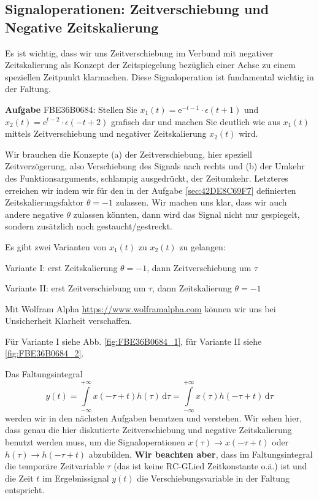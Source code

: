 \documentclass[11pt,a4paper,DIV=12]{scrartcl}
\numberwithin{equation}{section}
\numberwithin{figure}{section}
\newcommand\fsd{\mathrm{d}} %
\newcommand{\fig}[1]{Abb. \ref{#1}} %
\begin{document}
\subsection{Signaloperationen: Zeitverschiebung und Negative Zeitskalierung}
\label{sec:FBE36B0684}
\begin{Ziel}
Es ist wichtig, dass wir uns Zeitverschiebung im Verbund mit negativer Zeitskalierung
als Konzept der Zeitspiegelung bezüglich einer Achse zu einem speziellen Zeitpunkt
klarmachen. Diese Signaloperation ist fundamental wichtig in der Faltung.
\end{Ziel}
\textbf{Aufgabe} {\tiny FBE36B0684}: Stellen Sie
$x_1(t) = \mathrm{e}^{-t-1} \cdot \epsilon(t+1)$ und
$x_2(t) = \mathrm{e}^{t-2} \cdot \epsilon(-t+2)$
grafisch dar und machen Sie deutlich wie aus $x_1(t)$  mittels Zeitverschiebung
und negativer Zeitskalierung $x_2(t)$ wird.
\begin{Werkzeug}
Wir brauchen die Konzepte (a) der Zeitverschiebung, hier speziell Zeitverzögerung,
also Verschiebung des Signals nach rechts und (b) der Umkehr des Funktionsarguments,
schlampig ausgedrückt, der Zeitumkehr. Letzteres erreichen wir indem wir
für den in der Aufgabe \ref{sec:42DE8C69F7} definierten Zeitskalierungsfaktor
$\theta=-1$ zulassen. Wir machen uns klar, dass wir auch andere negative
$\theta$ zulassen könnten, dann wird das Signal nicht nur gespiegelt,
sondern zusätzlich noch gestaucht/gestreckt.
\end{Werkzeug}
\begin{Ansatz}
Es gibt zwei Varianten von $x_1(t)$ zu $x_2(t)$ zu gelangen:

Variante I: erst Zeitskalierung $\theta=-1$, dann Zeitverschiebung um $\tau$

Variante II: erst Zeitverschiebung um $\tau$, dann Zeitskalierung $\theta=-1$

\end{Ansatz}
\begin{ExCalc}
Mit Wolfram Alpha \url{https://www.wolframalpha.com} können wir uns bei
Unsicherheit Klarheit verschaffen.
\end{ExCalc}
\begin{Loesung}
Für Variante I siehe \fig{fig:FBE36B0684_1}, für Variante II siehe
\ref{fig:FBE36B0684_2}.

Das Faltungsintegral
\begin{equation}
y(t)
= \int\limits_{-\infty}^{+\infty} x(-\tau+t) h(\tau) \, \fsd \tau
= \int\limits_{-\infty}^{+\infty} x(\tau) h(-\tau+t) \, \fsd \tau
\end{equation}
werden wir in den nächsten Aufgaben benutzen und verstehen.
%
Wir sehen hier, dass genau die hier
diskutierte Zeitverschiebung und negative Zeitskalierung benutzt werden muss, um
die Signaloperationen $x(\tau) \rightarrow x(-\tau+t)$
oder $h(\tau) \rightarrow h(-\tau+t)$ abzubilden.
\textbf{Wir beachten aber}, dass im Faltungsintegral die temporäre Zeitvariable
$\tau$ (das ist keine RC-GLied Zeitkonstante o.ä.) ist und die Zeit $t$
im Ergebnissignal $y(t)$ die Verschiebungsvariable in der Faltung entspricht.
\end{Loesung}
\end{document}
